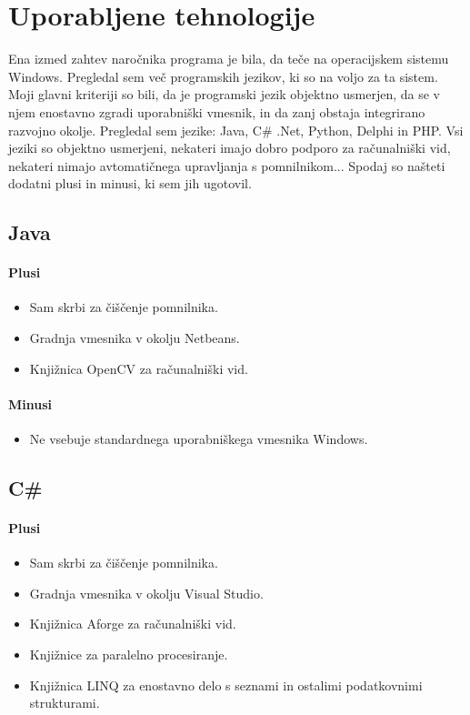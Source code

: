 \documentclass[oneside, a4paper, 12pt]{book}
\begin{document}
\section{Uporabljene tehnologije}
Ena izmed zahtev naročnika programa je bila, da teče na operacijskem sistemu Windows. Pregledal sem več programskih jezikov, ki so na voljo za ta sistem. Moji glavni kriteriji so bili, da je programski jezik objektno usmerjen, da se v njem enostavno zgradi uporabniški vmesnik, in da zanj obstaja integrirano razvojno okolje. Pregledal sem jezike: Java, C\# .Net, Python, Delphi in PHP. Vsi jeziki so objektno usmerjeni, nekateri imajo dobro podporo za računalniški vid, nekateri nimajo avtomatičnega upravljanja s pomnilnikom... Spodaj so našteti dodatni plusi in minusi, ki sem jih ugotovil.

\subsection{Java}
\paragraph{Plusi}
\begin{itemize}
\item Sam skrbi za čiščenje pomnilnika.
\item Gradnja vmesnika v okolju Netbeans.
\item Knjižnica OpenCV za računalniški vid.
\end{itemize}
\paragraph{Minusi}
\begin{itemize}
\item Ne vsebuje standardnega uporabniškega vmesnika Windows.
\end{itemize}

\subsection{C\#}
\paragraph{Plusi}
\begin{itemize}
\item Sam skrbi za čiščenje pomnilnika.
\item Gradnja vmesnika v okolju Visual Studio.
\item Knjižnica Aforge za računalniški vid.
\item Knjižnice za paralelno procesiranje.
\item Knjižnica LINQ za enostavno delo s seznami in ostalimi podatkovnimi strukturami.
\end{itemize}
\end{document}
